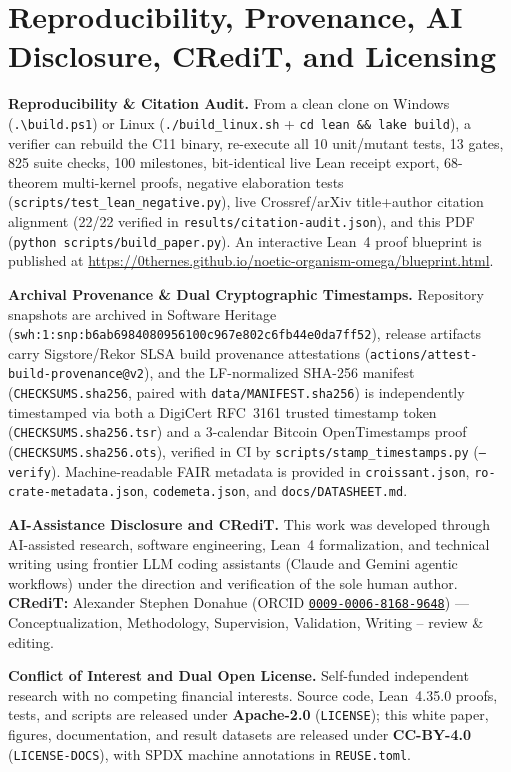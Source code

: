 \documentclass[11pt,reqno]{amsart}
\theoremstyle{remark}
\begin{document}
\section{Reproducibility, Provenance, AI Disclosure, CRediT, and Licensing}
\label{sec:repro}

\textbf{Reproducibility \& Citation Audit.} From a clean clone on Windows (\texttt{.\textbackslash build.ps1}) or Linux (\texttt{./build\_linux.sh} + \texttt{cd lean \&\& lake build}), a verifier can rebuild the C11 binary, re-execute all 10 unit/mutant tests, 13 gates, 825 suite checks, 100 milestones, bit-identical live Lean receipt export, 68-theorem multi-kernel proofs, negative elaboration tests (\texttt{scripts/test\_lean\_negative.py}), live Crossref/arXiv title+author citation alignment (22/22 verified in \texttt{results/citation-audit.json}), and this PDF (\texttt{python scripts/build\_paper.py}). An interactive Lean~4 proof blueprint is published at \url{https://0thernes.github.io/noetic-organism-omega/blueprint.html}.

\textbf{Archival Provenance \& Dual Cryptographic Timestamps.} Repository snapshots are archived in Software Heritage (\nolinkurl{swh:1:snp:b6ab6984080956100c967e802c6fb44e0da7ff52}), release artifacts carry Sigstore/Rekor SLSA build provenance attestations (\nolinkurl{actions/attest-build-provenance@v2}), and the LF-normalized SHA-256 manifest (\nolinkurl{CHECKSUMS.sha256}, paired with \nolinkurl{data/MANIFEST.sha256}) is independently timestamped via both a DigiCert RFC~3161 trusted timestamp token (\nolinkurl{CHECKSUMS.sha256.tsr}) and a 3-calendar Bitcoin OpenTimestamps proof (\nolinkurl{CHECKSUMS.sha256.ots}), verified in CI by \nolinkurl{scripts/stamp_timestamps.py} (\texttt{--verify}). Machine-readable FAIR metadata is provided in \texttt{croissant.json}, \nolinkurl{ro-crate-metadata.json}, \texttt{codemeta.json}, and \nolinkurl{docs/DATASHEET.md}.

\textbf{AI-Assistance Disclosure and CRediT.} This work was developed through AI-assisted research, software engineering, Lean~4 formalization, and technical writing using frontier LLM coding assistants (Claude and Gemini agentic workflows) under the direction and verification of the sole human author. \textbf{CRediT:} Alexander Stephen Donahue (ORCID \href{https://orcid.org/0009-0006-8168-9648}{\texttt{0009-0006-8168-9648}}) — Conceptualization, Methodology, Supervision, Validation, Writing -- review \& editing.

\textbf{Conflict of Interest and Dual Open License.} Self-funded independent research with no competing financial interests. Source code, Lean~4.35.0 proofs, tests, and scripts are released under \textbf{Apache-2.0} (\texttt{LICENSE}); this white paper, figures, documentation, and result datasets are released under \textbf{CC-BY-4.0} (\texttt{LICENSE-DOCS}), with SPDX machine annotations in \texttt{REUSE.toml}.



\end{document}
